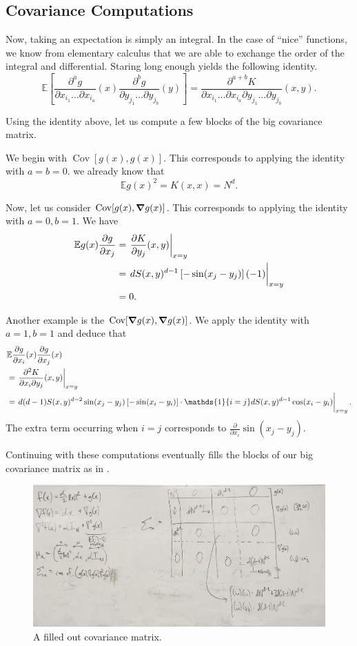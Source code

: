 \documentclass[12pt]{article}
\DeclareMathOperator{\Cov}{Cov}
\DeclarePairedDelimiter{\set}{\lbrace}{\rbrace}
\newcommand{\E}{\mathbb{E}}
\newcommand{\ones}{\mathds{1}}
\begin{document}
\subsection{Covariance Computations}
Now,
taking an expectation is simply an integral.
In the case of ``nice'' functions,
we know from elementary calculus that we are able to exchange the order of the integral and differential.
Staring long enough yields the following identity.
\[
  \E\left[ \frac{\partial^a g}{\partial x_{i_1}\dots \partial x_{i_a}}(x) \frac{\partial^b g}{\partial y_{j_1}\dots \partial y_{j_b}}(y) \right]
  = \frac{\partial^{a+b} K}{\partial x_{i_1}\dots \partial x_{i_a} \partial y_{j_1}\dots \partial y_{j_b}} (x, y).
\]

Using the identity above,
let us compute a few blocks of the big covariance matrix.

We begin with $\Cov[g(x), g(x)]$.
This corresponds to applying the identity with $a = b = 0$.
we already know that
\[
  \E g(x)^2 = K(x, x) = N^d.
\]

Now,
let us consider $\Cov[g(x), \grad g(x)]$.
This corresponds to applying the identity with $a=0, b=1$.
We have
\begin{align*}
  \E g(x) \frac{\partial g}{\partial x_j}
  &= \eval{\frac{\partial K}{\partial y_j}(x, y)}_{x=y} \\
  &= \eval{d S(x, y)^{d-1} \left[ -\sin(x_j-y_j) \right](-1)}_{x=y} \\
  &= 0.
\end{align*}

Another example is the $\Cov[\grad g(x), \grad g(x)]$.
We apply the identity with $a=1, b=1$
and deduce that
\begin{align*}
  &\E \frac{\partial g}{\partial x_i}(x) \frac{\partial g}{\partial x_j}(x) \\
  &= \eval{\frac{\partial^2 K}{\partial x_i \partial y_j}(x, y)}_{x=y} \\
  &= \eval{d(d-1) S(x, y)^{d-2} \sin(x_j - y_j) \left[ -\sin(x_i-y_i) \right]\cdot \ones\set{i=j} d S(x, y)^{d-1} \cos(x_i-y_i)}_{x=y}.
\end{align*}
The extra term occurring when $i=j$
corresponds to $\frac{\partial}{\partial x_i} \sin(x_j - y_j)$.

Continuing with these computations
eventually fills the blocks of our big covariance matrix
as in .
\begin{figure}[h]
  \centering
  \includegraphics[width=\linewidth]{fig/filled_matrix.jpeg}
  \caption{A filled out covariance matrix.}
  \label{fig:filled matrix}
\end{figure}
\end{document}
